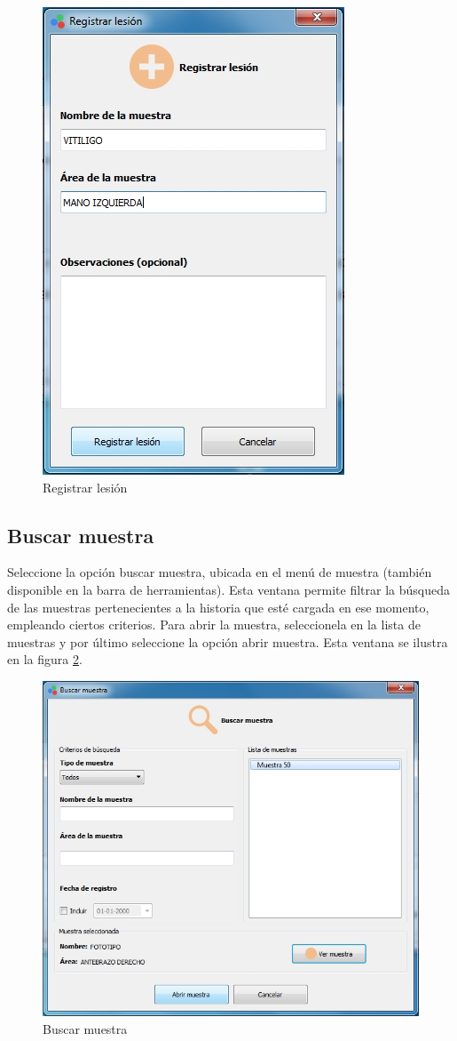 \begin{figure}[H]
  \centering
  \includegraphics[width=.6\linewidth]{./img/registrar-lesion.jpg}
\caption[]{Registrar lesi\'{o}n\label{fig:registrar-lesion}}
\end{figure}
\newpage
	\subsection*{Buscar muestra}

		Seleccione la opci\'{o}n buscar muestra, ubicada en el men\'{u} de muestra (tambi\'{e}n disponible en la barra de herramientas). Esta ventana permite filtrar la b\'{u}squeda de las muestras pertenecientes a la historia que est\'{e} cargada en ese momento, empleando ciertos criterios. Para abrir la muestra, seleccionela en la lista de muestras y por \'{u}ltimo seleccione la opci\'{o}n abrir muestra. Esta ventana se ilustra en la figura \ref{fig:buscar-muestra}.

\begin{figure}[H]
  \centering
  \includegraphics[width=.9\linewidth]{./img/buscar-muestra.jpg}
\caption[]{Buscar muestra\label{fig:buscar-muestra}}
\end{figure}
\newpage
